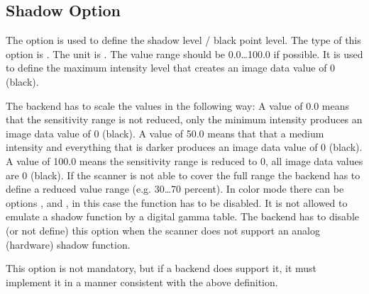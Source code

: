 \documentclass[11pt,DVIps]{report}
\begin{document}
\begin{changebar}
\subsection{Shadow Option}
The option  is used to define the shadow level / black point level.
The type of this option is .
The unit is . The value range
should be 0.0\ldots100.0 if possible.
It is used to define the maximum intensity level that creates an image data value
of 0 (black).

The backend has to scale the values in the following way:
A value of 0.0 means that the sensitivity range is not reduced, only the
minimum intensity produces an image data value of 0 (black).
A value of 50.0 means that that a medium intensity and everything that is darker
produces an image data value of 0 (black).
A value of 100.0 means the sensitivity range is reduced to 0, all image
data values are 0 (black).  If the scanner is not able to
cover the full range the backend has to define a reduced
value range (e.g. 30\ldots70 percent).
In color mode there can be options , 
and , in this case the  function has to be disabled.
It is not allowed to emulate a shadow function by
a digital gamma table. The backend has to disable (or not
define) this option when the scanner does not support an
analog (hardware) shadow function.

This option is not mandatory, but if a backend does support it, it
must implement it in a manner consistent with the above definition.
\end{changebar}
\end{document}
